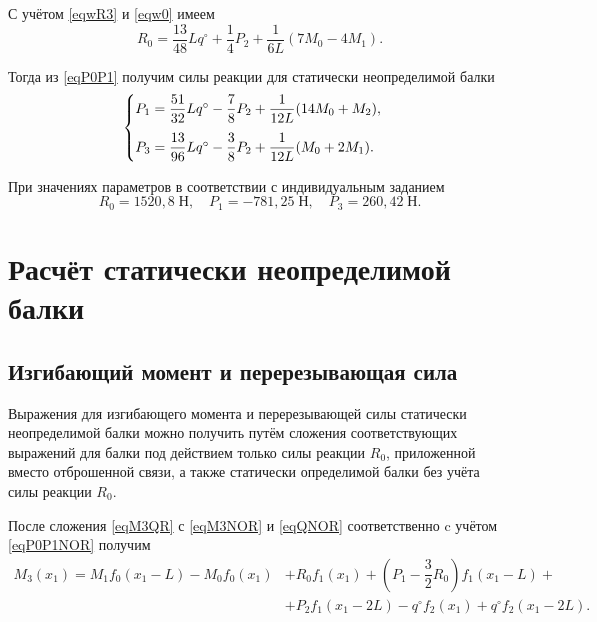 \documentclass[12pt, a4paper]{article}
\begin{document}
С учётом \eqref{eqwR3} и \eqref{eqw0} имеем
\begin{equation*}
	R_0 = \dfrac{13}{48} L q^{\circ} + \dfrac{1}{4} P_2 + \dfrac{1}{6L} (7 M_0 - 4 M_1).
\end{equation*}

Тогда из \eqref{eqP0P1} получим силы реакции для статически неопределимой балки
\begin{equation*}
	\begin{cases}\vspace{0.75em}
		P_1 = \dfrac{51}{32} L q^{\circ} - \dfrac{7}{8} P_2 + \dfrac{1}{12L} (14 M_0 + M_2), \\
		P_3 = \dfrac{13}{96} L q^{\circ} - \dfrac{3}{8} P_2 + \dfrac{1}{12L} (M_0 + 2 M_1). \\
	\end{cases}
\end{equation*}

При значениях параметров в соответствии с индивидуальным заданием
\vspace{-0.5em}
\[
R_0 = 1520{,}8 \; \text{Н}, \quad P_1 = -781{,}25 \; \text{Н}, \quad P_3 = 260{,}42 \; \text{Н}.
\]

\vspace{-1.5em}

\section{Расчёт статически неопределимой балки}
\subsection{Изгибающий момент и перерезывающая сила}

Выражения для изгибающего момента и перерезывающей силы статически неопределимой балки можно получить путём сложения соответствующих выражений для балки под действием только силы реакции $R_0$, приложенной вместо отброшенной связи, а также статически определимой балки без учёта силы реакции $R_0$. 

После сложения \eqref{eqM3QR} с \eqref{eqM3NOR} и \eqref{eqQNOR} соответственно c учётом \eqref{eqP0P1NOR} получим
\vspace{-0.25em}
\begin{equation*}
	\begin{split}
		M_3(x_1) = M_1 f_0(x_1 - L) - M_0 f_0(x_1) & + R_0 f_1(x_1) + \left( P_1 - \dfrac{3}{2} R_0 \right) f_1(x_1 - L) + \\ & + P_2 f_1(x_1 - 2L) - q^{\circ} f_2(x_1) + q^{\circ} f_2(x_1 - 2L).
	\end{split}
\end{equation*}
\end{document}
